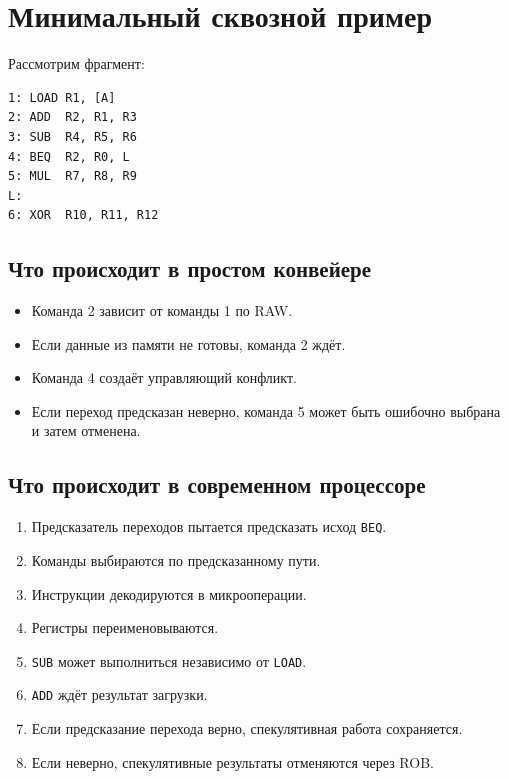 \documentclass[12pt,a4paper]{article}
\begin{document}
\section{Минимальный сквозной пример}

Рассмотрим фрагмент:

\begin{lstlisting}
1: LOAD R1, [A]
2: ADD  R2, R1, R3
3: SUB  R4, R5, R6
4: BEQ  R2, R0, L
5: MUL  R7, R8, R9
L:
6: XOR  R10, R11, R12
\end{lstlisting}

\subsection{Что происходит в простом конвейере}

\begin{itemize}
    \item Команда 2 зависит от команды 1 по RAW.
    \item Если данные из памяти не готовы, команда 2 ждёт.
    \item Команда 4 создаёт управляющий конфликт.
    \item Если переход предсказан неверно, команда 5 может быть ошибочно выбрана и затем отменена.
\end{itemize}

\subsection{Что происходит в современном процессоре}

\begin{enumerate}
    \item Предсказатель переходов пытается предсказать исход \texttt{BEQ}.
    \item Команды выбираются по предсказанному пути.
    \item Инструкции декодируются в микрооперации.
    \item Регистры переименовываются.
    \item \texttt{SUB} может выполниться независимо от \texttt{LOAD}.
    \item \texttt{ADD} ждёт результат загрузки.
    \item Если предсказание перехода верно, спекулятивная работа сохраняется.
    \item Если неверно, спекулятивные результаты отменяются через ROB.
\end{enumerate}
\end{document}
